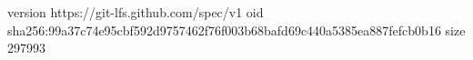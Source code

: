 version https://git-lfs.github.com/spec/v1
oid sha256:99a37c74e95cbf592d9757462f76f003b68bafd69c440a5385ea887fefcb0b16
size 297993
